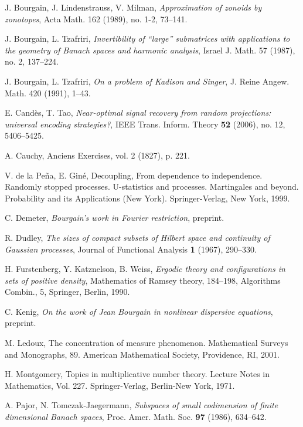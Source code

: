 \documentclass[12pt,a4paper,reqno]{amsart}
\numberwithin{equation}{section}
\theoremstyle{plain}
\theoremstyle{definition}
\begin{document}
\begin{thebibliography}{10}
J. Bourgain, J. Lindenstrauss, V. Milman, \emph{Approximation of zonoids by zonotopes}, Acta Math. 162 (1989), no. 1-2, 73--141.

J. Bourgain, L. Tzafriri, \emph{Invertibility of ``large'' submatrices with applications to the geometry of Banach spaces and harmonic analysis}, Israel J. Math. 57 (1987), no. 2, 137--224.

J. Bourgain, L. Tzafriri, \emph{On a problem of Kadison and Singer}, J. Reine Angew. Math. 420 (1991), 1--43.


E. Cand\`es, T. Tao, \emph{Near-optimal signal recovery from random projections: universal encoding strategies?}, IEEE Trans. Inform. Theory \textbf{52} (2006), no. 12, 5406--5425.

A. Cauchy, Anciens Exercises, vol. 2 (1827), p. 221. 

V. de la Pe\~{n}a, E. Gin\'e, Decoupling, From dependence to independence. Randomly stopped processes. U-statistics and processes. Martingales and beyond. Probability and its Applications (New York). Springer-Verlag, New York, 1999. 

C. Demeter, \emph{Bourgain's work in Fourier restriction}, preprint.

R. Dudley, \emph{The sizes of compact subsets of Hilbert space and continuity of Gaussian processes}, Journal of Functional Analysis \textbf{1} (1967), 290--330.

H. Furstenberg, Y. Katznelson, B. Weiss, \emph{Ergodic theory and configurations in sets of positive density}, Mathematics of Ramsey theory, 184--198, Algorithms Combin., 5, Springer, Berlin, 1990.

C. Kenig, \emph{On the work of Jean Bourgain in nonlinear dispersive
equations}, preprint.

M. Ledoux, The concentration of measure phenomenon. Mathematical Surveys and Monographs, 89. American Mathematical Society, Providence, RI, 2001.

H. Montgomery, Topics in multiplicative number theory. Lecture Notes in Mathematics, Vol. 227. Springer-Verlag, Berlin-New York, 1971.

A. Pajor, N. Tomczak-Jaegermann, \emph{Subspaces of small codimension of finite dimensional Banach spaces}, Proc. Amer. Math. Soc. \textbf{97} (1986), 634--642.


\end{thebibliography}
\end{document}
